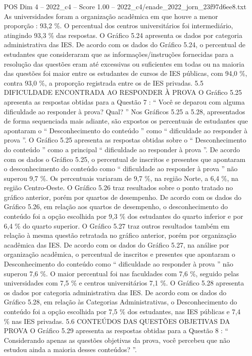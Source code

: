 \begin{textsample}{POS Dim 4 – 2022\_c4 – Score 1.00 – 2022\_c4/enade\_2022\_jorn\_23f97d6ee8.txt}
As universidades foram a organização acadêmica em que houve a menor proporção : 93,2 \%.
O percentual dos centros universitários foi intermediário, atingindo 93,3 \% das respostas.
O Gráfico 5.24 apresenta os dados por categoria administrativa das IES.
De acordo com os dados do Gráfico 5.24, o percentual de estudantes que consideraram que as informações/instruções fornecidas para a resolução das questões eram até excessivas ou suficientes em todas ou na maioria das questões foi maior entre os estudantes de cursos de IES públicas, com 94,0 \%, contra 93,0 \%, a proporção registrada entre os de IES privadas. 5.5 DIFICULDADE ENCONTRADA AO RESPONDER À PROVA O Gráfico 5.25 apresenta as respostas obtidas para a Questão 7 : “ Você se deparou com alguma dificuldade ao responder à prova?
Qual? ” Nos Gráficos 5.25 a 5.28, apresentados de forma sequenciada mais adiante, são expostos os percentuais de estudantes que apontaram o “ Desconhecimento do conteúdo ” como “ dificuldade ao responder à prova ”.
O Gráfico 5.25 apresenta as respostas obtidas sobre o “ Desconhecimento do conteúdo ” como a principal “ dificuldade ao responder à prova ”.
De acordo com os dados o Gráfico 5.25, o percentual de inscritos e presentes que apontaram o desconhecimento do conteúdo como “ dificuldade ao responder à prova ” não superou 9,7 \%.
Os percentuais variaram de 9,7 \%, na região Norte, a 6,4 \%, na região Centro-Oeste.
O Gráfico 5.26 traz resultados sobre o ponto tratado no gráfico anterior, porém por quartos de desempenho.
De acordo com os dados do Gráfico 5.26, em relação aos quartos de desempenho, o desconhecimento do conteúdo foi a opção escolhida por 9,3 \% dos estudantes do quarto inferior e por 6,4 \% do quarto superior.
O Gráfico 5.27 traz outros resultados também em relação à mesma questão retratada no gráfico anterior, porém por organização acadêmica das IES.
De acordo com os dados do Gráfico 5.27, na análise por organização acadêmica, o percentual de inscritos e presentes que apontaram o Desconhecimento do conteúdo como “ dificuldade ao responder à prova ” não superou 7,6 \%.
O maior percentual foi nas faculdades com 7,6 \%, seguido pelas universidades com 7,5 \% e centros universitários 7,1 \%.
O Gráfico 5.28 apresenta os dados por categoria administrativa das IES.
De acordo com os dados do Gráfico 5.28, em relação às Categorias Administrativas, o Desconhecimento do conteúdo foi a opção escolhida por 7,5 \% dos estudantes, nas IES públicas e 7,4 \% nas IES privadas. 5.6 CONTEÚDOS DAS QUESTÕES OBJETIVAS DA PROVA O Gráfico 5.29 apresenta as respostas obtidas para a Questão 8 : “ Considerando apenas as questões objetivas da prova, você percebeu que não estudou ainda a maioria desses conteúdos? ”.

\end{textsample}
